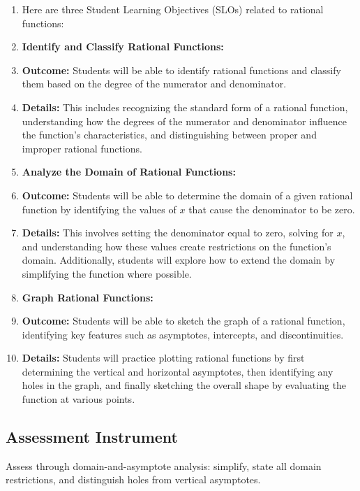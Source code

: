 \begin{enumerate}
    \item Here are three Student Learning Objectives (SLOs) related to rational functions:
    \item \textbf{Identify and Classify Rational Functions:}
    \item \textbf{Outcome:} Students will be able to identify rational functions and classify them based on the degree of the numerator and denominator.
    \item \textbf{Details:} This includes recognizing the standard form of a rational function, understanding how the degrees of the numerator and denominator influence the function's characteristics, and distinguishing between proper and improper rational functions.
    \item \textbf{Analyze the Domain of Rational Functions:}
    \item \textbf{Outcome:} Students will be able to determine the domain of a given rational function by identifying the values of $x$ that cause the denominator to be zero.
    \item \textbf{Details:} This involves setting the denominator equal to zero, solving for $x$, and understanding how these values create restrictions on the function's domain. Additionally, students will explore how to extend the domain by simplifying the function where possible.
    \item \textbf{Graph Rational Functions:}
    \item \textbf{Outcome:} Students will be able to sketch the graph of a rational function, identifying key features such as asymptotes, intercepts, and discontinuities.
    \item \textbf{Details:} Students will practice plotting rational functions by first determining the vertical and horizontal asymptotes, then identifying any holes in the graph, and finally sketching the overall shape by evaluating the function at various points.
\end{enumerate}


\subsection{Assessment Instrument}
\label{ssec:asse-3669}


Assess through domain-and-asymptote analysis: simplify, state all domain
restrictions, and distinguish holes from vertical asymptotes.


